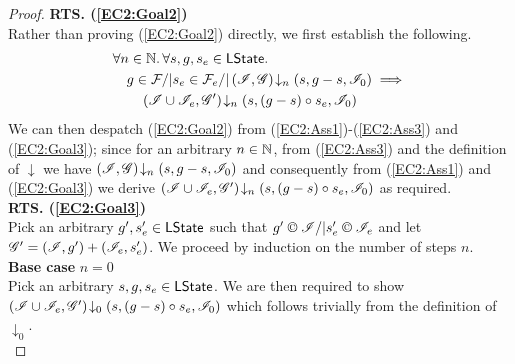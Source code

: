 \begin{lemma}
\begin{proof}
\noindent\textbf{RTS. (\ref{EC2:Goal2})} \\
Rather than proving (\ref{EC2:Goal2}) directly, we first establish the following.
%
\begin{align}
	& \forall n \in \mathbb{N}.\, \forall s, g, s_e \in \textsf{LState}.\, \nonumber\\
	& \quad g \in \mathcal{F}_{} /|  s_e \in \mathcal{F}_{e} /| \left(\mathscr{I}, \mathscr{G}\right) \!\downarrow_{n} \left(s, g-s, \mathscr{I}_0\right) \implies \nonumber\\
	& \qquad \left(\mathscr{I} \cup \mathscr{I}_e, \mathscr{G}'\right) \!\downarrow_{n} \left(s, (g-s) \circ s_e, \mathscr{I}_0\right) \label{EC2:Goal3}
\end{align}
%
We can then despatch (\ref{EC2:Goal2}) from (\ref{EC2:Ass1})-(\ref{EC2:Ass3}) and (\ref{EC2:Goal3}); since for an arbitrary $n \in \mathbb{N}$, from (\ref{EC2:Ass3}) and the definition of $\downarrow$ we have $\left(\mathscr{I}, \mathscr{G}\right) \!\downarrow_{n} \left(s, g-s, \mathscr{I}_0\right)$ and consequently from (\ref{EC2:Ass1}) and (\ref{EC2:Goal3}) we derive $\left(\mathscr{I} \cup \mathscr{I}_e, \mathscr{G}'\right) \!\downarrow_{n} \left(s, (g-s) \circ s_e, \mathscr{I}_0\right) $ as required. \\

\noindent\textbf{RTS. (\ref{EC2:Goal3})} \\
Pick an arbitrary $g', s_e' \in \textsf{LState}$ such that $g' \confines \lmod /| s_e' \confines \lmod_e$ and let $\mathscr{G}' = (\mathscr{I}, g') + (\mathscr{I}_e, s_e')$. We proceed by induction on the number of steps $n$.\\

\noindent\textbf{Base case }$n=0$\\
Pick an arbitrary $s, g, s_e \in \textsf{LState}$. We are then required to show	$\left(\mathscr{I} \cup \mathscr{I}_e, \mathscr{G}'\right) \!\downarrow_{0} \left(s, (g-s) \circ s_e, \mathscr{I}_0\right)$ which follows trivially from the definition of $\downarrow_0$.\\



\end{proof}
\end{lemma}

